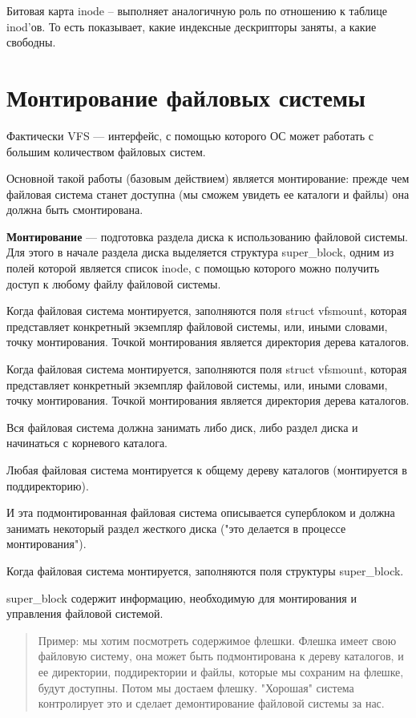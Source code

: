 Битовая карта inode -- выполняет аналогичную роль по отношению к таблице inod'ов. То есть показывает, какие индексные дескрипторы заняты, а какие свободны.

\section{Монтирование файловых системы}

Фактически VFS — интерфейс, с помощью которого ОС может работать с большим количеством файловых систем.

Основной такой работы (базовым действием) является монтирование: прежде чем файловая система станет доступна (мы сможем увидеть ее каталоги и файлы) она должна быть смонтирована.

\textbf{Монтирование} — подготовка раздела диска к использованию файловой системы. Для этого в начале раздела диска выделяется структура super\_block, одним из полей которой является список inode, с помощью которого можно получить доступ к любому файлу файловой системы.

Когда файловая система монтируется, заполняются поля struct vfsmount, которая представляет конкретный экземпляр файловой системы, или, иными словами, точку монтирования. Точкой монтирования является директория дерева каталогов.

Когда файловая система монтируется, заполняются поля struct vfsmount, которая представляет конкретный экземпляр файловой системы, или, иными словами, точку монтирования. Точкой монтирования является директория дерева каталогов.

Вся файловая система должна занимать либо диск, либо раздел диска и начинаться с корневого каталога.

Любая файловая система монтируется к общему дереву каталогов (монтируется в поддиректорию).

И эта подмонтированная файловая система описывается суперблоком и должна занимать некоторый раздел жесткого диска ("это делается в процессе монтирования").

Когда файловая система монтируется, заполняются поля структуры super\_block.

super\_block содержит информацию, необходимую для монтирования и управления файловой системой.

\begin{quote}
Пример: мы хотим посмотреть содержимое флешки. Флешка имеет свою файловую систему, она может быть подмонтирована к дереву каталогов, и ее директории, поддиректории и файлы, которые мы сохраним на флешке, будут доступны. Потом мы достаем флешку. "Хорошая" система контролирует это и сделает демонтирование файловой системы за нас.
\end{quote}

